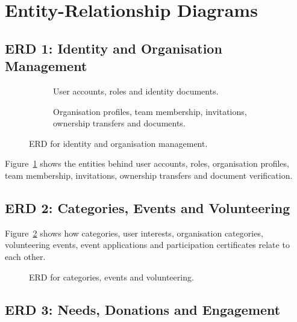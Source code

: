 \section{Entity-Relationship Diagrams}
\label{sec:erd}



\subsection{ERD 1: Identity and Organisation Management}


\begin{figure}[H]
    \centering
    \begin{subfigure}[t]{\textwidth}
        \centering
        \caption{User accounts, roles and identity documents.}
    \end{subfigure}
    \par\vspace{0.3in}
    \begin{subfigure}[t]{\textwidth}
        \centering
        \caption{Organisation profiles, team membership, invitations, ownership transfers and documents.}
    \end{subfigure}
    \caption{ERD for identity and organisation management.}
    \label{fig:erd-identity}
\end{figure}
\noindent Figure~\ref{fig:erd-identity} shows the entities behind user accounts, roles, organisation profiles, team membership, invitations, ownership transfers and document verification.

\subsection{ERD 2: Categories, Events and Volunteering}

Figure~\ref{fig:erd-events} shows how categories, user interests, organisation categories, volunteering events, event applications and participation certificates relate to each other.

\begin{figure}[H]
    \centering
    \caption{ERD for categories, events and volunteering.}
    \label{fig:erd-events}
\end{figure}

\clearpage
\subsection{ERD 3: Needs, Donations and Engagement}

